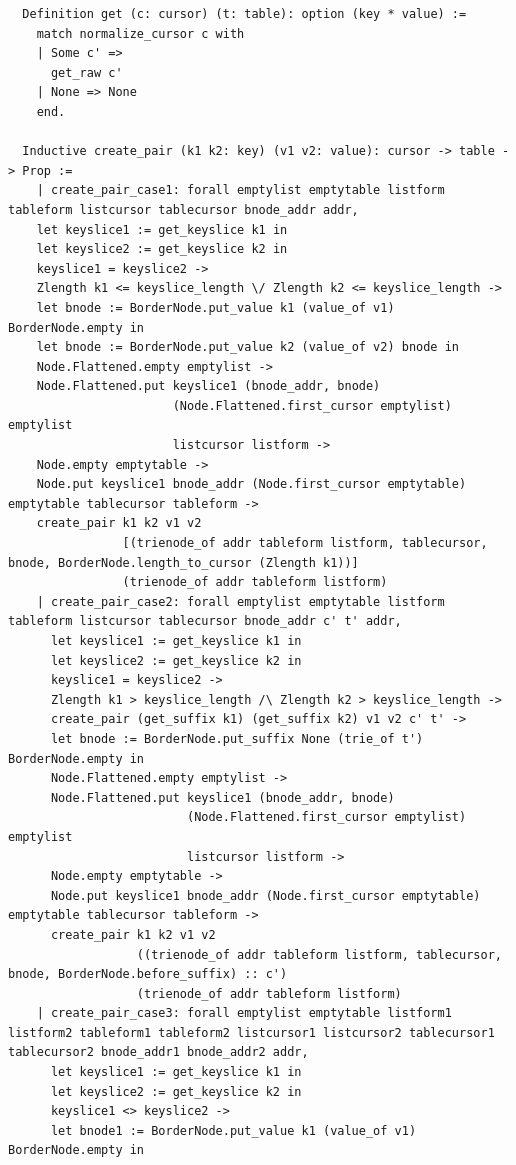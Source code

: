 \documentclass[runningheads]{llncs}
\begin{document}
\begin{verbatim}
  Definition get (c: cursor) (t: table): option (key * value) :=
    match normalize_cursor c with
    | Some c' =>
      get_raw c'
    | None => None
    end.

  Inductive create_pair (k1 k2: key) (v1 v2: value): cursor -> table -> Prop :=
    | create_pair_case1: forall emptylist emptytable listform tableform listcursor tablecursor bnode_addr addr,
    let keyslice1 := get_keyslice k1 in
    let keyslice2 := get_keyslice k2 in
    keyslice1 = keyslice2 ->
    Zlength k1 <= keyslice_length \/ Zlength k2 <= keyslice_length ->
    let bnode := BorderNode.put_value k1 (value_of v1) BorderNode.empty in
    let bnode := BorderNode.put_value k2 (value_of v2) bnode in
    Node.Flattened.empty emptylist ->
    Node.Flattened.put keyslice1 (bnode_addr, bnode)
                       (Node.Flattened.first_cursor emptylist) emptylist
                       listcursor listform ->
    Node.empty emptytable ->
    Node.put keyslice1 bnode_addr (Node.first_cursor emptytable) emptytable tablecursor tableform ->
    create_pair k1 k2 v1 v2
                [(trienode_of addr tableform listform, tablecursor, bnode, BorderNode.length_to_cursor (Zlength k1))]
                (trienode_of addr tableform listform)
    | create_pair_case2: forall emptylist emptytable listform tableform listcursor tablecursor bnode_addr c' t' addr,
      let keyslice1 := get_keyslice k1 in
      let keyslice2 := get_keyslice k2 in
      keyslice1 = keyslice2 ->
      Zlength k1 > keyslice_length /\ Zlength k2 > keyslice_length ->
      create_pair (get_suffix k1) (get_suffix k2) v1 v2 c' t' ->
      let bnode := BorderNode.put_suffix None (trie_of t') BorderNode.empty in
      Node.Flattened.empty emptylist ->
      Node.Flattened.put keyslice1 (bnode_addr, bnode)
                         (Node.Flattened.first_cursor emptylist) emptylist
                         listcursor listform ->
      Node.empty emptytable ->
      Node.put keyslice1 bnode_addr (Node.first_cursor emptytable) emptytable tablecursor tableform ->
      create_pair k1 k2 v1 v2
                  ((trienode_of addr tableform listform, tablecursor, bnode, BorderNode.before_suffix) :: c')
                  (trienode_of addr tableform listform)
    | create_pair_case3: forall emptylist emptytable listform1 listform2 tableform1 tableform2 listcursor1 listcursor2 tablecursor1 tablecursor2 bnode_addr1 bnode_addr2 addr,
      let keyslice1 := get_keyslice k1 in
      let keyslice2 := get_keyslice k2 in
      keyslice1 <> keyslice2 ->
      let bnode1 := BorderNode.put_value k1 (value_of v1) BorderNode.empty in

\end{verbatim}
\end{document}
